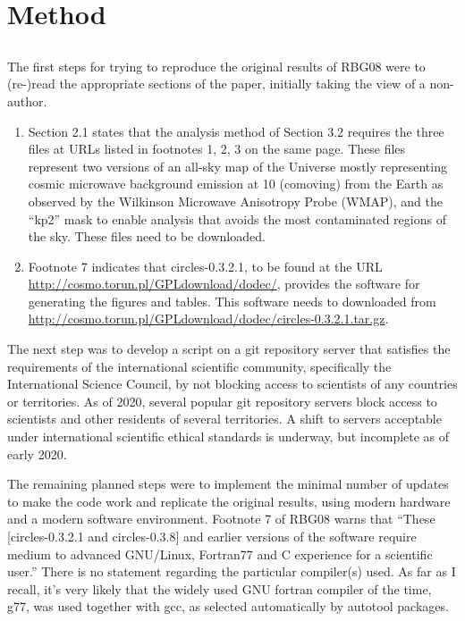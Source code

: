 \section{Method}

\subsection{}
The first steps for trying to reproduce the original results
of RBG08 were to (re-)read the appropriate sections of the paper,
initially taking the view of a non-author.
\begin{enumerate}
\item
  Section 2.1\supercite{RBG08} states that the analysis method of
  Section 3.2 requires the three files at URLs listed in footnotes 1,
  2, 3 on the same page. These files represent two versions of an
  all-sky map of the Universe mostly representing cosmic microwave
  background emission at 10{\hGpc} (comoving) from the Earth as
  observed by the Wilkinson Microwave Anisotropy Probe
  (WMAP)\supercite{WMAP5Hinshaw}, and the ``kp2'' mask to enable
  analysis that avoids the most contaminated regions of the sky. These
  files need to be downloaded.
\item
  Footnote 7\supercite{RBG08} indicates that {\sc circles-0.3.2.1}, to
  be found at the URL \url{http://cosmo.torun.pl/GPLdownload/dodec/},
  provides the software for generating the figures and tables. This
  software needs to downloaded from
  \url{http://cosmo.torun.pl/GPLdownload/dodec/circles-0.3.2.1.tar.gz}.
\end{enumerate}

The next step was to develop a script on a {\sc git} repository server
that satisfies the requirements of the international scientific
community, specifically the International Science
Council\supercite{ISCFreedoms}, by not blocking access to scientists
of any countries or territories.  As of 2020, several popular {\sc
  git} repository servers block access to scientists and other
residents of several territories\supercite{Github2020}. A shift to
servers acceptable under international scientific ethical standards is
underway, but incomplete as of early 2020.

The remaining planned steps were to implement the minimal number of
updates to make the code work and replicate the original results,
using modern hardware and a modern software environment. Footnote 7 of
RBG08 warns that ``These [{\sc circles-0.3.2.1} and {\sc
    circles-0.3.8}] and earlier versions of the software require
medium to advanced {\sc GNU/Linux}, {\sc Fortran77} and {\sc C}
experience for a scientific user.'' There is no statement regarding
the particular compiler(s) used.  As far as I recall, it's very likely
that the widely used GNU fortran compiler of the time, {\sc g77}, was
used together with {\sc gcc}, as selected automatically by {\sc
  autotool} packages.

